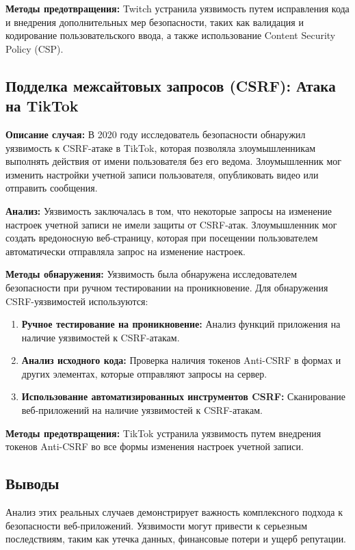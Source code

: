 \documentclass[a4paper,12pt]{diplom}
\begin{document}
	 \textbf{Методы предотвращения:} Twitch устранила уязвимость путем исправления кода и внедрения дополнительных мер безопасности, таких как валидация и кодирование пользовательского ввода, а также использование Content Security Policy (CSP).
	 
	 \subsection{Подделка межсайтовых запросов (CSRF): Атака на TikTok}
	 
	 \textbf{Описание случая:} В 2020 году исследователь безопасности обнаружил уязвимость к CSRF-атаке в TikTok, которая позволяла злоумышленникам выполнять действия от имени пользователя без его ведома.  Злоумышленник мог изменить настройки учетной записи пользователя, опубликовать видео или отправить сообщения.
	 
	 \textbf{Анализ:} Уязвимость заключалась в том, что некоторые запросы на изменение настроек учетной записи не имели  защиты от CSRF-атак.  Злоумышленник мог создать вредоносную веб-страницу, которая при посещении пользователем автоматически отправляла запрос на изменение настроек.
	 
	 \textbf{Методы обнаружения:} Уязвимость была обнаружена исследователем безопасности при ручном тестировании на проникновение. Для обнаружения CSRF-уязвимостей используются:
	 
	 \begin{enumerate}[label=\arabic{enumi})]
	 	\item \textbf{Ручное тестирование на проникновение:} Анализ функций приложения на наличие уязвимостей к CSRF-атакам.
	 	\item \textbf{Анализ исходного кода:} Проверка наличия токенов Anti-CSRF в формах и других элементах, которые отправляют запросы на сервер.
	 	\item \textbf{Использование автоматизированных инструментов CSRF:} Сканирование веб-приложений на наличие уязвимостей к CSRF-атакам. 
	 \end{enumerate}
	 
	 \textbf{Методы предотвращения:} TikTok устранила уязвимость путем внедрения токенов Anti-CSRF во все формы изменения настроек учетной записи. 
	 
	 
	 \subsection{Выводы}
	 
	 Анализ этих реальных случаев демонстрирует важность комплексного подхода к безопасности веб-приложений. Уязвимости могут привести к серьезным последствиям, таким как утечка данных, финансовые потери и ущерб репутации. 
	 
\end{document}
